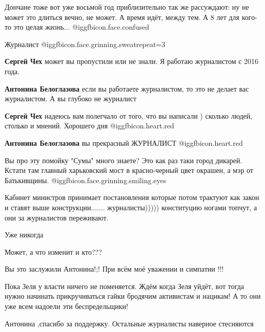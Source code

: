 \begin{itemize}

Дончане тоже вот уже восьмой год приблизительно так же рассуждают: ну не может
это длиться вечно, не может. А время идёт, между тем. А 8 лет для кого-то это
целая жизнь...  @igg{fbicon.face.confused} 


Журналист @igg{fbicon.face.grinning.sweat}{repeat=3} 

\begin{itemize} %
\textbf{Сергей Чех} может вы пропустили или не знали. Я работаю журналистом с 2016 года.

\textbf{Антонина Белоглазова} если вы работаете журналистом, то это не делает вас журналистом. А вы глубоко не журналист


\textbf{Сергей Чех} надеюсь вам полегчало от того, что вы написали ) сколько людей, столько и мнений. Хорошего дня
	@igg{fbicon.heart.red}

\textbf{Антонина Белоглазова} вы прекрасный ЖУРНАЛИСТ @igg{fbicon.heart.red}

\end{itemize} %


Вы про эту помойку "Сумы" много знаете? Это как раз таки город дикарей. Кстати
там главный харьковский мост в красно-черный цвет окрашен, а мэр от
Батькивщины.  @igg{fbicon.face.grinning.smiling.eyes} 


Кабинет министров принимает постановления которые потом трактуют как закон и
ставят выше конструкции....... журналисты))))) конституцию ногами топчут, а они
за журналистов переживают.

Уже никогда

Может, а что изменит и кто???

Вы это заслужили Антонина!;! При всём моё уважении и симпатии !!!

Пока Зеля у власти ничего не поменяется.
Ждём когда Зеля уйдёт, вот тогда нужно начинать прикручиваться гайки бродячим активистам и нацикам!
А то они уже всем надоели эти беспредельщики!

Антонина ,спасибо за поддержку. Остальные журналисты наверное стесняются



\end{itemize}
